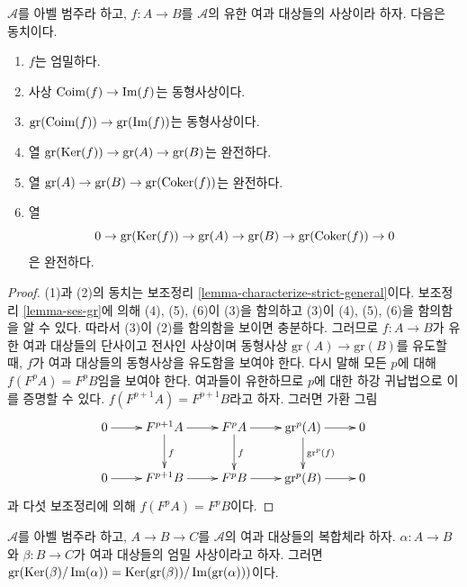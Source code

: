 \begin{lemma}
\label{lemma-characterize-strict}
$\mathcal{A}$를 아벨 범주라 하고, $f : A \to B$를 $\mathcal{A}$의
유한 여과 대상들의 사상이라 하자. 다음은 동치이다.
\begin{enumerate}
\item $f$는 엄밀하다.
\item 사상 $\mathop{\mathrm{Coim}}(f) \to \mathop{\mathrm{Im}}(f)$는 동형사상이다.
\item $\text{gr}(\mathop{\mathrm{Coim}}(f)) \to \text{gr}(\mathop{\mathrm{Im}}(f))$는 동형사상이다.
\item 열 $\text{gr}(\mathop{\mathrm{Ker}}(f)) \to \text{gr}(A) \to \text{gr}(B)$는
완전하다.
\item 열 $\text{gr}(A) \to \text{gr}(B) \to
\text{gr}(\mathop{\mathrm{Coker}}(f))$는 완전하다.
\item 열
$$
0 \to
\text{gr}(\mathop{\mathrm{Ker}}(f)) \to
\text{gr}(A) \to
\text{gr}(B) \to
\text{gr}(\mathop{\mathrm{Coker}}(f)) \to 0
$$
은 완전하다.
\end{enumerate}
\end{lemma}

\begin{proof}
(1)과 (2)의 동치는 보조정리 \ref{lemma-characterize-strict-general}이다.
보조정리 \ref{lemma-ses-gr}에 의해 (4), (5), (6)이 (3)을 함의하고
(3)이 (4), (5), (6)을 함의함을 알 수 있다. 따라서 (3)이 (2)를
함의함을 보이면 충분하다. 그러므로 $f : A \to B$가 유한 여과
대상들의 단사이고 전사인 사상이며 동형사상
$\text{gr}(A) \to \text{gr}(B)$를 유도할 때, $f$가 여과 대상들의
동형사상을 유도함을 보여야 한다.
다시 말해 모든 $p$에 대해 $f(F^pA) = F^pB$임을 보여야 한다.
여과들이 유한하므로 $p$에 대한 하강 귀납법으로 이를 증명할 수 있다.
$f(F^{p + 1}A) = F^{p + 1}B$라고 하자. 그러면 가환 그림
$$
\xymatrix{
0 \ar[r] &
F^{p + 1}A \ar[r] \ar[d]^f &
F^pA \ar[r] \ar[d]^f &
\text{gr}^p(A) \ar[r] \ar[d]^{\text{gr}^p(f)} &
0 \\
0 \ar[r] &
F^{p + 1}B \ar[r] &
F^pB \ar[r] &
\text{gr}^p(B) \ar[r] &
0
}
$$
과 다섯 보조정리에 의해 $f(F^pA) = F^pB$이다.
\end{proof}

\begin{lemma}
\label{lemma-filtered-complex}
$\mathcal{A}$를 아벨 범주라 하고, $A \to B \to C$를
$\mathcal{A}$의 여과 대상들의 복합체라 하자.
$\alpha : A \to B$와 $\beta : B \to C$가 여과 대상들의 엄밀
사상이라고 하자. 그러면
$\text{gr}(\mathop{\mathrm{Ker}}(\beta)/\mathop{\mathrm{Im}}(\alpha)) =
\mathop{\mathrm{Ker}}(\text{gr}(\beta))/\mathop{\mathrm{Im}}(\text{gr}(\alpha)))$이다.
\end{lemma}

